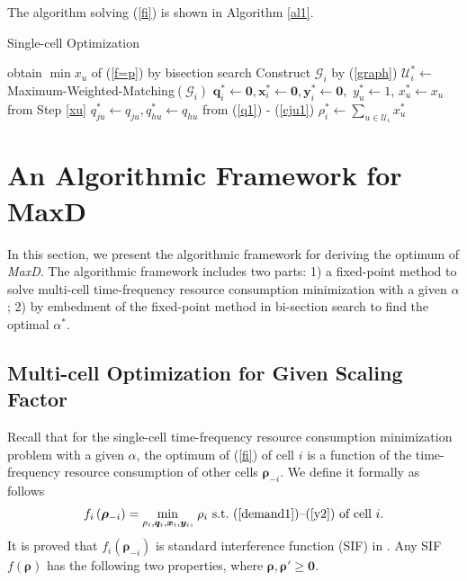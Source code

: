 \documentclass[10pt,journal,final,finalsubmission,twocolumn]{IEEEtran}
\begin{document}
The algorithm solving (\ref{fi}) is shown in Algorithm \ref{al1}.

 \begin{algorithm}[tbp]\label{al1}
\caption{Single-cell Optimization} 
{
	obtain $\min x_u$ of (\ref{f=p}) by bisection search\label{xu}\;
}
Construct $\mathcal{G}_i$ by (\ref{graph})\;
$\mathcal{U}^*_i\leftarrow $ Maximum-Weighted-Matching$\left (\mathcal{G}_i\right)$\label{MWM}\;
$\boldsymbol{q}^*_i \leftarrow \boldsymbol{0},\boldsymbol{x}^*_i \leftarrow \boldsymbol{0}, \boldsymbol{y}^*_i \leftarrow \boldsymbol{0},$\;
{
$y_u^*\leftarrow1$, $x_u^* \leftarrow x_u$ from Step \ref{xu} \;
$q_{ju}^*\leftarrow q_{ju}, q_{hu}^*\leftarrow q_{hu}$ from (\ref{q1}) - (\ref{cju1})\;
}
$\rho_i^*\leftarrow\sum_{u\in{\mathcal{U}}_i} x_u^*$\;
\;
\end{algorithm} 


\section{An Algorithmic Framework for MaxD}\label{CellLoadsMinimization}

In this section, we present the algorithmic framework for deriving the optimum of {\em MaxD}. The algorithmic framework includes two parts: 1) a fixed-point method to solve multi-cell time-frequency resource consumption minimization with a given $\alpha$; 2) by embedment of the fixed-point method in bi-section search to find the optimal $\alpha^*$.

\subsection{Multi-cell Optimization for Given Scaling Factor}\label{MulticellLoadsMinimization}

Recall that for the single-cell time-frequency resource consumption minimization problem with a given $\alpha$, the optimum of (\ref{fi}) of cell $i$ is a function of the time-frequency resource consumption of other cells $\boldsymbol{\rho}_{-i}$. We define it formally as follows
\begin{equation}\label{fi2}
f_i\left (\boldsymbol{\rho}_{-i}\right ) =  \underset{\rho_i, \boldsymbol{q}_i,\boldsymbol{x}_i,\boldsymbol{y}_i,}{\min} \ \rho_i\  \textup{s.t.\ (\ref{demand1})--(\ref{y2}) of cell $i$} .
\end{equation}
It is proved that $f_i\left (\boldsymbol{\rho}_{-i}\right )$ is standard interference function (SIF) in \cite{Yates}. Any SIF $f\left( \boldsymbol{\rho}\right)$ has the following two properties, where $\boldsymbol{\rho}, \boldsymbol{\rho}' \geq \boldsymbol{0}$.
\end{document}
